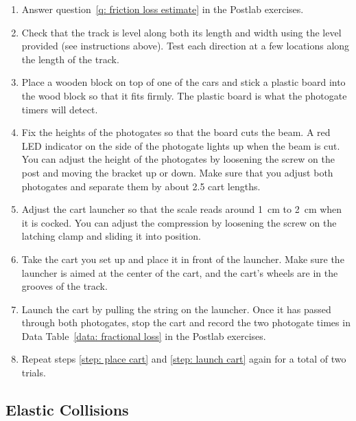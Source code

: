 \documentclass[addpoints]{physlabs}
\begin{document}
\begin{labsection}
\begin{experiment}
    \begin{enumerate}
        \item Answer question~\ref{q: friction loss estimate} in the Postlab exercises.

        \item Check that the track is level along both its length and width using the level provided (see instructions above). Test each direction at a few locations along the length of the track.

        \item Place a wooden block on top of one of the cars and stick a plastic board into the wood block so that it fits firmly. The plastic board is what the photogate timers will detect.

        \item Fix the heights of the photogates so that the board cuts the beam. A red LED indicator on the side of the photogate lights up when the beam is cut. You can adjust the height of the photogates by loosening the screw on the post and moving the bracket up or down. Make sure that you adjust both photogates and separate them by about 2.5 cart lengths.

        \item Adjust the cart launcher so that the scale reads around \qty{1}{\centi\meter} to \qty{2}{\centi\meter} when it is cocked. You can adjust the compression by loosening the screw on the latching clamp and sliding it into position.

        \item Take the cart you set up and place it in front of the launcher. Make sure the launcher is aimed at the center of the cart, and the cart's wheels are in the grooves of the track. \label{step: place cart}

        \item Launch the cart by pulling the string on the launcher. Once it has passed through both photogates, stop the cart and record the two photogate times in Data Table~\ref{data: fractional loss} in the Postlab exercises. \label{step: launch cart}

        \item Repeat steps \ref{step: place cart} and \ref{step: launch cart} again for a total of two trials.
    \end{enumerate}

    \subsection*{Elastic Collisions}


\end{experiment}
\end{labsection}
\end{document}
